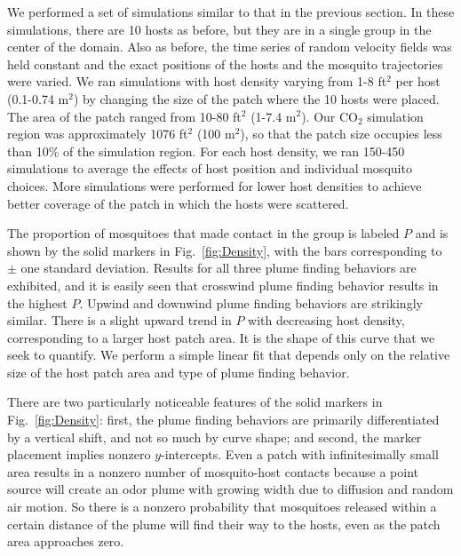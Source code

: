 \documentclass[10pt]{article}
\begin{document}
We performed a set of simulations similar to that in the previous section. In these simulations, there are 10 hosts as before, but they are in a single group in the center of the domain. Also as before, the time series of random velocity fields was held constant and the exact positions of the hosts and the mosquito trajectories were varied. We ran simulations with host density varying from 1-8 ft$^2$ per host (0.1-0.74 m$^2$) by changing the size of the patch where the 10 hosts were placed.  The area of the patch ranged from 10-80 ft$^2$ (1-7.4 m$^2$). Our CO$_2$ simulation region was approximately 1076 ft$^2$ (100 m$^2$), so that the patch size occupies less than 10\% of the simulation region. For each host density, we ran 150-450 simulations to average the effects of host position and individual mosquito choices. More simulations were performed for lower host densities to achieve better coverage of the patch in which the hosts were scattered.

The proportion of mosquitoes that made contact in the group is labeled $P$ and is shown by the solid markers in Fig.~\ref{fig:Density}, with the bars corresponding to $\pm$ one standard deviation. Results for all three plume finding behaviors are exhibited, and it is easily seen that crosswind plume finding behavior results in the highest $P$. Upwind and downwind plume finding behaviors are strikingly similar. There is a slight upward trend in $P$ with decreasing host density, corresponding to a larger host patch area. It is the shape of this curve that we seek to quantify. We perform a simple linear fit that depends only on the relative size of the host patch area and type of plume finding behavior.


There are two particularly noticeable features of the solid markers in Fig.~\ref{fig:Density}: first, the plume finding behaviors are primarily differentiated by a vertical shift, and not so much by curve shape; and second, the marker placement implies nonzero $y$-intercepts.
Even a patch with infinitesimally small area results in a nonzero number of mosquito-host contacts because a point source will create an odor plume with growing width due to diffusion and random air motion. So there is a nonzero probability that mosquitoes released within a certain distance of the plume will find their way to the hosts, even as the patch area approaches zero.
\end{document}
